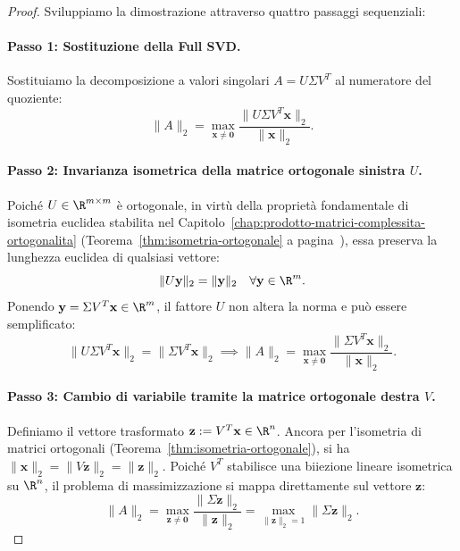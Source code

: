\begin{proof}
Sviluppiamo la dimostrazione attraverso quattro passaggi sequenziali:

\paragraph{Passo 1: Sostituzione della Full SVD.}
Sostituiamo la decomposizione a valori singolari $A = U \Sigma V^T$ al numeratore del quoziente:
\begin{equation}
    \|A\|_2 = \max_{\mathbf{x} \neq \mathbf{0}} \frac{\|U \Sigma V^T \mathbf{x}\|_2}{\|\mathbf{x}\|_2}.
\end{equation}

\paragraph{Passo 2: Invarianza isometrica della matrice ortogonale sinistra $U$.}
Poich\'e $U \in \R^{m \times m}$ \`e ortogonale, in virt\`u della propriet\`a fondamentale di isometria euclidea stabilita nel Capitolo~\ref{chap:prodotto-matrici-complessita-ortogonalita} (Teorema~\ref{thm:isometria-ortogonale} a pagina~\pageref{thm:isometria-ortogonale}), essa preserva la lunghezza euclidea di qualsiasi vettore:
\begin{equation}
    \|U \mathbf{y}\|_2 = \|\mathbf{y}\|_2 \quad \forall \mathbf{y} \in \R^m.
\end{equation}
Ponendo $\mathbf{y} = \Sigma V^T \mathbf{x} \in \R^m$, il fattore $U$ non altera la norma e pu\`o essere semplificato:
\begin{equation}
    \|U \Sigma V^T \mathbf{x}\|_2 = \|\Sigma V^T \mathbf{x}\|_2 \implies \|A\|_2 = \max_{\mathbf{x} \neq \mathbf{0}} \frac{\|\Sigma V^T \mathbf{x}\|_2}{\|\mathbf{x}\|_2}.
\end{equation}

\paragraph{Passo 3: Cambio di variabile tramite la matrice ortogonale destra $V$.}
Definiamo il vettore trasformato $\mathbf{z} := V^T \mathbf{x} \in \R^n$. Ancora per l'isometria di matrici ortogonali (Teorema~\ref{thm:isometria-ortogonale}), si ha $\|\mathbf{x}\|_2 = \|V \mathbf{z}\|_2 = \|\mathbf{z}\|_2$. Poich\'e $V^T$ stabilisce una biiezione lineare isometrica su $\R^n$, il problema di massimizzazione si mappa direttamente sul vettore $\mathbf{z}$:
\begin{equation}
    \|A\|_2 = \max_{\mathbf{z} \neq \mathbf{0}} \frac{\|\Sigma \mathbf{z}\|_2}{\|\mathbf{z}\|_2} = \max_{\|\mathbf{z}\|_2 = 1} \|\Sigma \mathbf{z}\|_2.
\end{equation}


\end{proof}

